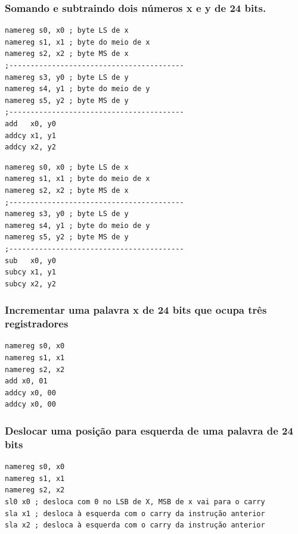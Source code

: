 \documentclass{article}
\begin{document}
\subsubsection{Somando e subtraindo dois números x e y de 24 bits.}
\begin{boxedd}
\begin{lstlisting}
namereg s0, x0 ; byte LS de x
namereg s1, x1 ; byte do meio de x
namereg s2, x2 ; byte MS de x
;-----------------------------------------
namereg s3, y0 ; byte LS de y
namereg s4, y1 ; byte do meio de y
namereg s5, y2 ; byte MS de y
;-----------------------------------------
add   x0, y0
addcy x1, y1
addcy x2, y2
\end{lstlisting}
\end{boxedd}


\begin{boxedd}
\begin{lstlisting}
namereg s0, x0 ; byte LS de x
namereg s1, x1 ; byte do meio de x
namereg s2, x2 ; byte MS de x
;-----------------------------------------
namereg s3, y0 ; byte LS de y
namereg s4, y1 ; byte do meio de y
namereg s5, y2 ; byte MS de y
;-----------------------------------------
sub   x0, y0
subcy x1, y1
subcy x2, y2
\end{lstlisting}
\end{boxedd}

\subsubsection{Incrementar uma palavra x de 24 bits que ocupa três registradores}
\begin{boxedd}
\begin{lstlisting}
namereg s0, x0
namereg s1, x1
namereg s2, x2
add x0, 01
addcy x0, 00
addcy x0, 00
\end{lstlisting}
\end{boxedd}

\newpage
\subsubsection{Deslocar uma posição para esquerda de uma palavra de 24 bits}
\begin{boxedd}
\begin{lstlisting}
namereg s0, x0
namereg s1, x1
namereg s2, x2
sl0 x0 ; desloca com 0 no LSB de X, MSB de x vai para o carry
sla x1 ; desloca à esquerda com o carry da instrução anterior
sla x2 ; desloca à esquerda com o carry da instrução anterior
\end{lstlisting}
\end{boxedd}
\end{document}
